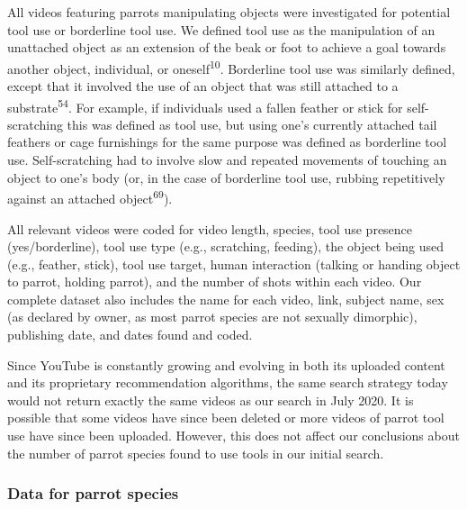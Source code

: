 \documentclass[
  man, donotrepeattitle,floatsintext]{apa6}
\begin{document}
All videos featuring parrots manipulating objects were investigated for
potential tool use or borderline tool use. We defined tool use as the
manipulation of an unattached object as an extension of the beak or foot to
achieve a goal towards another object, individual, or oneself\textsuperscript{10}.
Borderline tool use was similarly defined, except that it involved the use of an
object that was still attached to a substrate\textsuperscript{54}. For example, if
individuals used a fallen feather or stick for self-scratching this was defined
as tool use, but using one's currently attached tail feathers or cage
furnishings for the same purpose was defined as borderline tool use.
Self-scratching had to involve slow and repeated movements of touching an object
to one's body (or, in the case of borderline tool use, rubbing repetitively
against an attached object\textsuperscript{69}).

All relevant videos were coded for video length, species, tool use presence
(yes/borderline), tool use type (e.g., scratching, feeding), the object being
used (e.g., feather, stick), tool use target, human interaction
(talking or handing object to parrot, holding parrot), and the number of shots
within each video. Our complete dataset also includes the name for each video,
link, subject name, sex (as declared by owner, as most parrot species are not
sexually dimorphic), publishing date, and dates found and coded.

Since YouTube is constantly growing and evolving in both its uploaded content
and its proprietary recommendation algorithms, the same search strategy today
would not return exactly the same videos as our search in July 2020. It is
possible that some videos have since been deleted or more videos of parrot tool
use have since been uploaded. However, this does not affect our conclusions
about the number of parrot species found to use tools in our initial search.

\hypertarget{data-for-parrot-species}{%
\subsubsection{Data for parrot species}\label{data-for-parrot-species}}
\end{document}
